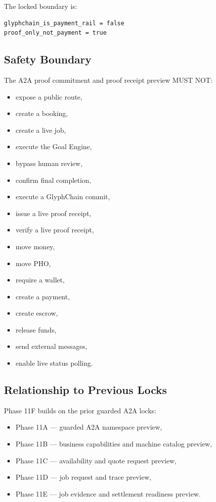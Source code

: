 The locked boundary is:

\begin{verbatim}
glyphchain_is_payment_rail = false
proof_only_not_payment = true
\end{verbatim}

\subsection{Safety Boundary}

The A2A proof commitment and proof receipt preview MUST NOT:

\begin{itemize}
  \item expose a public route,
  \item create a booking,
  \item create a live job,
  \item execute the Goal Engine,
  \item bypass human review,
  \item confirm final completion,
  \item execute a GlyphChain commit,
  \item issue a live proof receipt,
  \item verify a live proof receipt,
  \item move money,
  \item move PHO,
  \item require a wallet,
  \item create a payment,
  \item create escrow,
  \item release funds,
  \item send external messages,
  \item enable live status polling.
\end{itemize}

\subsection{Relationship to Previous Locks}

Phase 11F builds on the prior guarded A2A locks:

\begin{itemize}
  \item Phase 11A --- guarded A2A namespace preview,
  \item Phase 11B --- business capabilities and machine catalog preview,
  \item Phase 11C --- availability and quote request preview,
  \item Phase 11D --- job request and trace preview,
  \item Phase 11E --- job evidence and settlement readiness preview.
\end{itemize}

